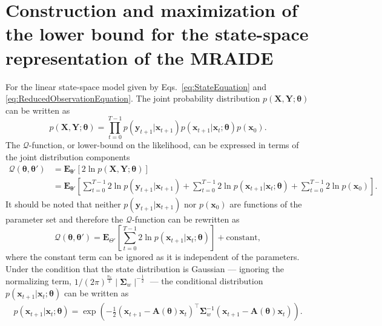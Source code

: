 \documentclass[review,authoryear,3p]{elsarticle}
\begin{document}
\section{Construction and maximization of the lower bound for the state-space representation of the MRAIDE}\label{ap:QDerivation}
For the linear state-space model given by Eqs.~\eqref{eq:StateEquation} and \eqref{eq:ReducedObservationEquation}. The joint probability distribution $p(\mathbf X,\mathbf Y;\boldsymbol \theta)$ can be written as
 \begin{equation}\label{eq:jointdistribution}
  p(\mathbf X,\mathbf Y;\boldsymbol \theta)=\prod_{t=0}^{T-1} p(\mathbf y_{t+1}|\mathbf x_{t+1})p(\mathbf x_{t+1}|\mathbf x_{t};\boldsymbol \theta)p(\mathbf x_0).
 \end{equation}
The $\mathcal Q$-function, or lower-bound on the likelihood, can be expressed in terms of the joint distribution components
 \begin{align}
  \mathcal Q(\boldsymbol \theta,\boldsymbol\theta')&=\mathbf E_{\boldsymbol \theta'}\left[2\ln p(\mathbf X,\mathbf Y;\boldsymbol \theta)\right] \nonumber \\
 &=\mathbf E_{\boldsymbol\theta'}\left[\sum_{t=0}^{T-1}2\ln p(\mathbf y_{t+1}|\mathbf x_{t+1})+\sum_{t=0}^{T-1}2\ln p(\mathbf x_{t+1}|\mathbf x_{t};\boldsymbol \theta)
 +\sum_{t=0}^{T-1}2\ln p(\mathbf x_0)\right].
 \end{align}   
It should be noted that neither $p(\mathbf y_{t+1}|\mathbf x_{t+1})$ nor $p(\mathbf x_0)$ are functions of the parameter set and therefore the $\mathcal Q$-function can be rewritten as
\begin{equation}
\mathcal Q(\boldsymbol \theta,\boldsymbol\theta')=\mathbf E_{\Theta'}\left[\sum_{t=0}^{T-1}2\ln p(\mathbf x_{t+1}|\mathbf x_{t};\boldsymbol \theta)\right]+\mathrm{constant},
\end{equation}
where the constant term can be ignored as it is independent of the parameters. Under the condition that the state distribution is Gaussian --- ignoring the normalizing term, $1/(2\pi)^{\frac{n_x}{2}}\mid\boldsymbol\Sigma_w\mid^{-\frac{1}{2}}$ --- the conditional distribution $p(\mathbf x_{t+1} | \mathbf x_{t};\boldsymbol\theta)$ can be written as
\begin{align}
p(\mathbf x_{t+1} | \mathbf x_{t};\boldsymbol\theta)=  \exp\left({-\frac{1}{2}\left(\mathbf x_{t+1}-\mathbf A\left(\boldsymbol\theta\right)\mathbf  x_t\right)^\top\boldsymbol\Sigma_w^{-1}\left(\mathbf x_{t+1}-\mathbf A\left(\boldsymbol\theta\right)\mathbf  x_t\right)}\right).
\end{align}
\end{document}
